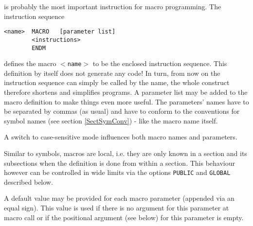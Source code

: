 \documentclass[12pt,twoside]{report}
\newcommand{\tty}[1]{{\tt #1}}
\begin{document}
is probably the most important instruction for macro programming.
The instruction sequence
\begin{verbatim}
<name>  MACRO   [parameter list]
        <instructions>
        ENDM
\end{verbatim}
defines the macro \tty{$<$name$>$} to be the enclosed instruction sequence.
This definition by itself does not generate any code!  In turn, from
now on the instruction sequence can simply be called by the name, the
whole construct therefore shortens and simplifies programs.  A
parameter list may be added to the macro definition to make things
even more useful.  The parameters' names have to be separated by
commas (as usual) and have to conform to the conventions for symbol
names (see section \ref{SectSymConv}) - like the macro name itself.

A switch to case-sensitive mode influences both macro names and
parameters.

Similar to symbols, macros are local, i.e. they are only known in a
section and its subsections when the definition is done from within
a section.  This behaviour however can be controlled in wide limits
via the options \tty{PUBLIC} and \tty{GLOBAL} described below.

A default value may be provided for each macro parameter
(appended via an equal sign).  This value is used if there is no
argument for this parameter at macro call or if the positional
argument (see below) for this parameter is empty.
\end{document}
